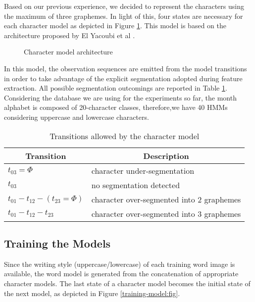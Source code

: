 \documentclass{article}[14pt, oneside, a4paper, times]
\begin{document}
Based on our previous experience, we decided to represent the characters using the maximum of three graphemes. In light of this, four states are necessary for each character model as depicted in Figure \ref{charactermodel:fig}. This model is based on the architecture proposed by El Yacoubi et al \cite{El99}.

\begin{figure}[htbp]
   \centering
   \caption{Character model architecture}
   \label{charactermodel:fig}
\end{figure}


In this model, the observation sequences are emitted from the model transitions in order to take advantage of the explicit segmentation adopted during feature extraction. All possible segmentation outcomings are reported in Table \ref{seg-outcoming:tab}. Considering the database we are using for the experiments so far, the month alphabet is composed of 20-character classes, therefore,we have 40 HMMs considering uppercase and lowercase characters.


\begin{table} [ht!]
\caption {Transitions allowed by the character model}
\begin{center}
\begin{tabular}{ll} \hline 
 \multicolumn{1}{c}{Transition}&
 \multicolumn{1}{c}{Description} \\ \hline

$t_{03} = \Phi $ & character under-segmentation \\
$t_{03}$         & no segmentation detected \\
$t_{01}-t_{12}-(t_{23} = \Phi)$ & character over-segmented into 2 graphemes \\
$t_{01}-t_{12}-t_{23}$ & character over-segmented into 3 graphemes \\ \hline


\end{tabular}
\label{seg-outcoming:tab}
\end{center}
\end{table}

\subsection{Training the Models}

Since the writing style (uppercase/lowercase) of each training word image is available, the word model is generated from the concatenation of appropriate character models. The last state of a character model becomes the initial state of the next model, as depicted in Figure \ref{training-model:fig}.
\end{document}

